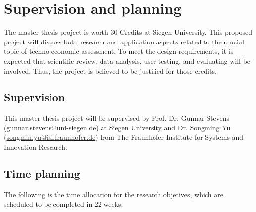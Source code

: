 \section{Supervision and planning} 




The master thesis project is worth 30 Credits at Siegen University. 
This proposed project will discuss both research and application aspects 
related to the crucial topic of techno-economic assessment. 
To meet the design requirements, 
it is expected that scientific review, data analysis, user testing, and evaluating will be involved. 
Thus, the project is believed to be justified for those credits.


\subsection{Supervision}


This master thesis project will be supervised by 
Prof. Dr. Gunnar Stevens (\href{mailto:gunnar.stevens@uni-siegen.de}{gunnar.stevens@uni-siegen.de}) at Siegen University and 
Dr. Songming Yu (\href{mailto:songmin.yu@isi.fraunhofer.de}{songmin.yu@isi.fraunhofer.de}) from The Fraunhofer Institute for Systems and Innovation Research. 


\subsection{Time planning}


The following is the time allocation for the research objetives, 
which are scheduled to be completed in 22 weeks. \\

